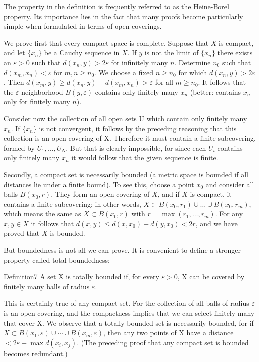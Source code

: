 The property in the definition is frequently referred to as the Heine-Borel property. Its importance lies in the fact that many proofs become particularly simple when formulated in terms of open coverings.

We prove first that every compact space is complete. Suppose that $X$ is compact, and let $\{x_n\}$ be a Cauchy sequence in $X$. If $y$ is not the limit of $\{x_n\}$ there exists an $\varepsilon > 0$ such that $d(x_n,y) > 2\varepsilon$ for infinitely many $n$. Determine $n_0$ such that $d(x_m,x_n) < \varepsilon$ for $m,n \geq n_0$. We choose a fixed $n \geq n_0$ for which $d(x_n,y) > 2\varepsilon$. Then $d(x_m,y) \geq d(x_n,y) - d(x_m,x_n) > \varepsilon$ for all $m \geq n_0$. It follows that the $\varepsilon$-neighborhood $B(y,\varepsilon)$ contains only finitely many $x_n$ (better: contains $x_n$ only for finitely many $n$).

Consider now the collection of all open sets U which contain only finitely many $x_{n}$. If $\{x_{n}\}$ is not convergent, it follows by the preceding reasoning that this collection is an open covering of X. Therefore it must contain a finite subcovering, formed by $U_{1}, \ldots, U_{N}$. But that is clearly impossible, for since each $U_{i}$ contains only finitely many $x_{n}$ it would follow that the given sequence is finite.

Secondly, a compact set is necessarily bounded (a metric space is bounded if all distances lie under a finite bound). To see this, choose a point $x_0$ and consider all balls $B(x_0, r)$. They form an open covering of $X$, and if $X$ is compact, it contains a finite subcovering; in other words, $X \subset B(x_0, r_1) \cup \dots \cup B(x_0, r_m)$, which means the same as $X \subset B(x_0, r)$ with $r = \max(r_1, \ldots, r_m)$. For any $x, y \in X$ it follows that $d(x, y) \leq d(x, x_0) + d(y, x_0) < 2r$, and we have proved that $X$ is bounded.

But boundedness is not all we can prove. It is convenient to define a stronger property called total boundedness:

\begin{originalstatement}{Definition}{7}\label{def:3.7}
A set X is totally bounded if, for every $\varepsilon > 0$, X can be covered by finitely many balls of radius $\varepsilon$.
\end{originalstatement}
This is certainly true of any compact set. For the collection of all balls of radius $\varepsilon$ is an open covering, and the compactness implies that we can select finitely many that cover X. We observe that a totally bounded set is necessarily bounded, for if $X \subset B(x_{1}, \varepsilon) \cup \cdots \cup B(x_{m}, \varepsilon)$, then any two points of X have a distance $<2\varepsilon + \max d(x_{i}, x_{j})$. (The preceding proof that any compact set is bounded becomes redundant.)

